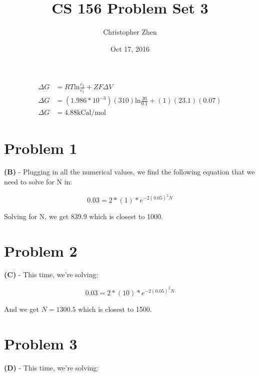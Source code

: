 \documentclass[10pt,letter]{article}
\begin{document}


\title{CS 156 Problem Set 3}

\author{Christopher Zhen}

\date{Oct 17, 2016}
 
\maketitle 

\begin{align*}
\Delta G & = RT\textrm{ln}\frac{c_2}{c_1} + ZF\Delta V \\
\Delta G & = (1.986*10^{-3})(310)\textrm{ln}\frac{20}{0.1} + (1)(23.1)(0.07) \\
\Delta G & = 4.88 \textrm{kCal/mol}
\end{align*}

\section*{Problem 1}

\textbf{(B)} - Plugging in all the numerical values, we find the following equation that we need to solve for N in:

\begin{equation}
0.03 = 2*(1)*e^{-2 (0.05) ^{2} N}
\end{equation}

Solving for N, we get 839.9 which is closest to 1000.

\section*{Problem 2}

\textbf{(C)} - This time, we're solving:

\begin{equation}
0.03 = 2*(10)*e^{-2 (0.05) ^{2} N}
\end{equation}

And we get $N = 1300.5$ which is closest to 1500.

\section*{Problem 3} 

\textbf{(D)} - This time, we're solving:
\end{document}
